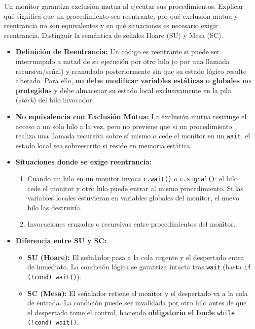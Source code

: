 \documentclass[11pt,a4paper,twoside,openright]{report}
\begin{document}
\begin{ejercicio}
Un monitor garantiza exclusión mutua al ejecutar sus procedimientos. Explicar qué significa que un procedimiento sea reentrante, por qué exclusión mutua y reentrancia no son equivalentes y en qué situaciones es necesario exigir reentrancia. Distinguir la semántica de señales Hoare (SU) y Mesa (SC).
\end{ejercicio}

\begin{solucion}
\begin{itemize}[leftmargin=*]
    \item \textbf{Definición de Reentrancia:} Un código es reentrante si puede ser interrumpido a mitad de su ejecución por otro hilo (o por una llamada recursiva/señal) y reanudado posteriormente sin que su estado lógico resulte alterado. Para ello, \textbf{no debe modificar variables estáticas o globales no protegidas} y debe almacenar su estado local exclusivamente en la pila (\emph{stack}) del hilo invocador.
    \item \textbf{No equivalencia con Exclusión Mutua:} La exclusión mutua restringe el acceso a un solo hilo a la vez, pero no previene que si un procedimiento realiza una llamada recursiva sobre sí mismo o cede el monitor en un \texttt{wait}, el estado local sea sobreescrito si reside en memoria estática.
    \item \textbf{Situaciones donde se exige reentrancia:}
    \begin{enumerate}
        \item Cuando un hilo en un monitor invoca \texttt{c.wait()} o \texttt{c.signal()}: el hilo cede el monitor y otro hilo puede entrar al mismo procedimiento. Si las variables locales estuvieran en variables globales del monitor, el nuevo hilo las destruiría.
        \item Invocaciones cruzadas o recursivas entre procedimientos del monitor.
    \end{enumerate}
    \item \textbf{Diferencia entre SU y SC:}
    \begin{itemize}
        \item \textbf{SU (Hoare):} El señalador pasa a la cola urgente y el despertado entra de inmediato. La condición lógica se garantiza intacta tras \texttt{wait} (basta \texttt{if (!cond) wait()}).
        \item \textbf{SC (Mesa):} El señalador retiene el monitor y el despertado va a la cola de entrada. La condición puede ser invalidada por otro hilo antes de que el despertado tome el control, haciendo \textbf{obligatorio el bucle} \texttt{while (!cond) wait()}.
    \end{itemize}
\end{itemize}
\end{solucion}
\end{document}

